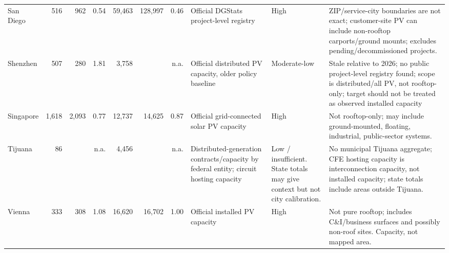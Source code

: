 \begin{tabular}{@{}p{1.45cm}rrrrrrp{3.4cm}p{2.1cm}p{3.8cm}@{}}
San Diego & 516 & 962 & 0.54 & 59,463 & 128,997 & 0.46 & Official DGStats project-level registry & High & ZIP/service-city boundaries are not exact; customer-site PV can include non-rooftop carports/ground mounts; excludes pending/decommissioned projects. \\
Shenzhen & 507 & 280 & 1.81 & 3,758 &  & n.a. & Official distributed PV capacity, older policy baseline & Moderate-low & Stale relative to 2026; no public project-level registry found; scope is distributed/all PV, not rooftop-only; target should not be treated as observed installed capacity \\
Singapore & 1,618 & 2,093 & 0.77 & 12,737 & 14,625 & 0.87 & Official grid-connected solar PV capacity & High & Not rooftop-only; may include ground-mounted, floating, industrial, public-sector systems. \\
Tijuana & 86 &  & n.a. & 4,456 &  & n.a. & Distributed-generation contracts/capacity by federal entity; circuit hosting capacity & Low / insufficient. State totals may give context but not city calibration. & No municipal Tijuana aggregate; CFE hosting capacity is interconnection capacity, not installed capacity; state totals include areas outside Tijuana. \\
Vienna & 333 & 308 & 1.08 & 16,620 & 16,702 & 1.00 & Official installed PV capacity & High & Not pure rooftop; includes C\&I/business surfaces and possibly non-roof sites. Capacity, not mapped area. \\
\bottomrule
\end{tabular}
